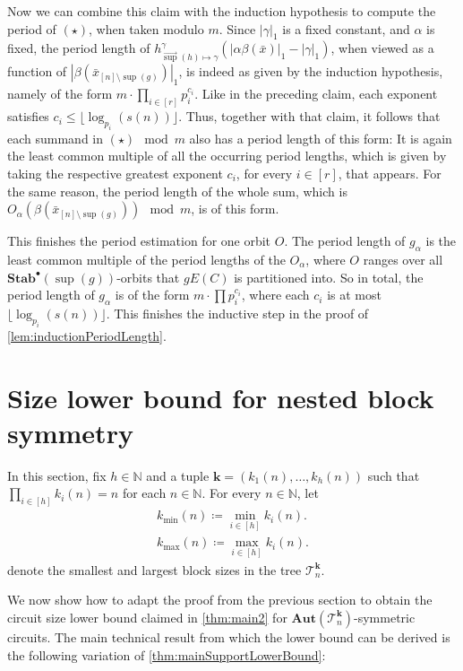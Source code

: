 \documentclass[11pt]{article}
\DeclareMathOperator{\supp}{sup}
\newcommand{\Aut}{\mathbf{Aut}}
\newcommand{\StabP}{\mathbf{Stab}^{\bullet}}
\newcommand{\bbN}{\mathbb{N}}
\newcommand{\Tt}{{\mathcal T}}
\theoremstyle{definition}
\theoremstyle{plain}
\theoremstyle{remark}
\theoremstyle{remark}
\begin{document}
Now we can combine this claim with the induction hypothesis to compute the period of $(\star)$, when taken modulo $m$.
Since $|\gamma|_1$ is a fixed constant, and $\alpha$ is fixed, the period length of $h^{\gamma}_{\vec{\supp}(h) \mapsto \gamma}(|\alpha\beta(\bar{x})|_1 - |\gamma|_1)$, when viewed as a function of $|\beta(\bar{x}_{[n] \setminus \supp(g)})|_1$, is indeed as given by the induction hypothesis, namely of the form
$
m \cdot \prod_{i \in [r]} p_i^{c_i}.
$
Like in the preceding claim, each exponent satisfies $c_i \leq \lfloor \log_{p_i}(s(n)) \rfloor$.
Thus, together with that claim, it follows that each summand in $(\star) \mod m$ also has a period length of this form: It is again the least common multiple of all the occurring period lengths, which is given by taking the respective greatest exponent $c_i$, for every $i \in [r]$, that appears. 
For the same reason, the period length of the whole sum, which is $O_\alpha(\beta(\bar{x}_{[n] \setminus \supp(g)})) \mod m$, is of this form.

This finishes the period estimation for one orbit $O$. The period length of $g_\alpha$ is the least common multiple of the period lengths of the $O_\alpha$, where $O$ ranges over all $\StabP(\supp(g))$-orbits that $gE(C)$ is partitioned into.
So in total, the period length of $g_\alpha$ is of the form $m \cdot \prod p_i^{c_i}$, where each $c_i$ is at most $\lfloor \log_{p_i}(s(n)) \rfloor$.
This finishes the inductive step in the proof of \cref{lem:inductionPeriodLength}.










\section{Size lower bound for nested block symmetry}

In this section, fix $h \in \bbN$ and a tuple $\boldsymbol{k} = (k_1(n), \dots, k_h(n))$ such that $\prod_{i \in [h]} k_i(n) = n$ for each $n \in \bbN$.
For every $n \in \bbN$, let 
\begin{align*}
k_{\text{min}}(n) \coloneqq \min_{i \in [h]} k_i(n).\\
k_{\text{max}}(n) \coloneqq \max_{i \in [h]} k_i(n).
\end{align*}
denote the smallest and largest block sizes in the tree $\Tt_n^{\boldsymbol{k}}$. 

We now show how to adapt the proof from the previous section to obtain the circuit size lower bound claimed in \cref{thm:main2} for $\Aut(\Tt_n^{\boldsymbol{k}})$-symmetric circuits. 
The main technical result from which the lower bound can be derived is the following variation of \cref{thm:mainSupportLowerBound}:
\end{document}
